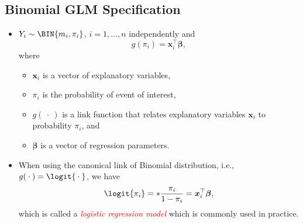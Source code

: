 \documentclass{article}\usepackage[]{graphicx}\usepackage[svgnames]{xcolor}
\let\log\relax%
\providecommand{\Vector}[1]{\bm{#1}}%
\begin{document}
\subsection*{Binomial GLM Specification}
\begin{itemize}
      \item $ Y_i \sim \BIN{m_i,\pi_i} $, $ i=1,\ldots,n $ independently and
            \[ g(\pi_i)=\Vector{x}_i^\top \Vector{\beta}, \]
            where
            \begin{itemize}
                  \item $ \Vector{x}_i $ is a vector of explanatory variables,
                  \item $ \pi_i $ is the probability of event of interest,
                  \item $ g(\:\cdot\:) $ is a link function that relates explanatory variables $ \Vector{x}_i $
                        to probability $ \pi_i $, and
                  \item $ \Vector{\beta} $ is a vector of regression parameters.
            \end{itemize}
      \item When using the canonical link of Binomial distribution, i.e., $ g(\:\cdot\:)=\logit{\:\cdot\:} $, we
            have
            \[ \logit{\pi_i}=\log*{\frac{\pi_i}{1-\pi_i}}=\Vector{x}_i^\top \Vector{\beta}, \]
            which is called a \emph{\textcolor{Red}{logistic regression model}} which is commonly used in practice.
\end{itemize}
\end{document}
